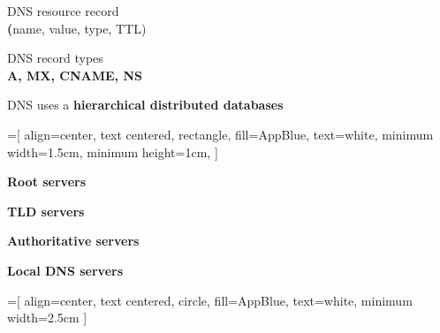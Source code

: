 \begin{cf}{
DNS resource record\\
\textbf(name, value, type, TTL)
}
\end{cf}

\begin{cf}{
DNS record types\\
\textbf{A, MX, CNAME, NS}
}
\end{cf}

\begin{cf}{
DNS uses a \textbf{hierarchical distributed databases}
}
\end{cf}

\begin{frame}[t]\begin{center}\scriptsize
	=[
			align=center, 
			text centered,
			rectangle,
			fill=AppBlue,
			text=white,
			minimum width=1.5cm,
			minimum height=1cm,
		]
\end{center}\end{frame}

\begin{cf}{
\textbf{Root servers}
}
\end{cf}

\begin{cf}{
\textbf{TLD servers}
}
\end{cf}

\begin{cf}{
\textbf{Authoritative servers}
}
\end{cf}

\begin{cf}{
\textbf{Local DNS servers}
}
\end{cf}

\begin{frame}[t]\begin{center}\normalsize{
	=[
			align=center, 
			text centered,
			circle,
			fill=AppBlue,
			text=white,
			minimum width=2.5cm
		]
}
\end{center}\end{frame}

